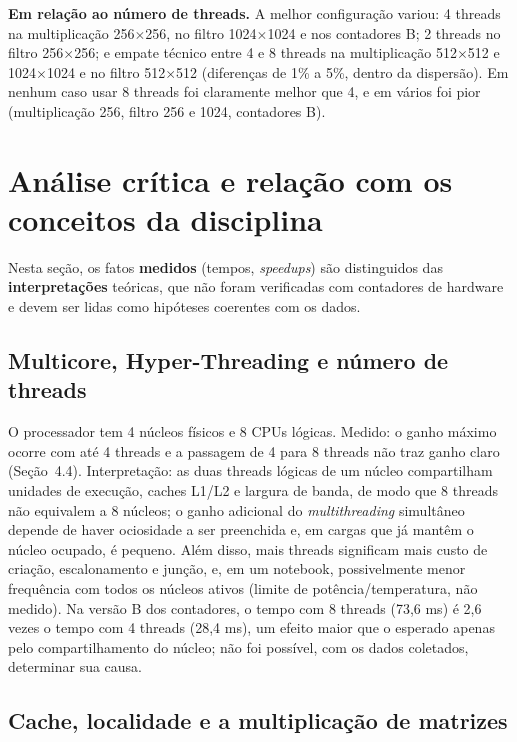 \documentclass[12pt,a4paper]{article}
\newcommand{\tx}{$\times$}
\begin{document}
\textbf{Em relação ao número de threads.} A melhor configuração variou: 4 threads na multiplicação 256\tx256, no filtro 1024\tx1024 e nos contadores B; 2 threads no filtro 256\tx256; e empate técnico entre 4 e 8 threads na multiplicação 512\tx512 e 1024\tx1024 e no filtro 512\tx512 (diferenças de 1\% a 5\%, dentro da dispersão). Em nenhum caso usar 8 threads foi claramente melhor que 4, e em vários foi pior (multiplicação 256, filtro 256 e 1024, contadores B).

\section{Análise crítica e relação com os conceitos da disciplina}

Nesta seção, os fatos \textbf{medidos} (tempos, \emph{speedups}) são distinguidos das \textbf{interpretações} teóricas, que não foram verificadas com contadores de hardware e devem ser lidas como hipóteses coerentes com os dados.

\subsection{Multicore, Hyper-Threading e número de threads}

O processador tem 4 núcleos físicos e 8 CPUs lógicas. Medido: o ganho máximo ocorre com até 4 threads e a passagem de 4 para 8 threads não traz ganho claro (Seção~4.4). Interpretação: as duas threads lógicas de um núcleo compartilham unidades de execução, caches L1/L2 e largura de banda, de modo que 8 threads não equivalem a 8 núcleos; o ganho adicional do \emph{multithreading} simultâneo depende de haver ociosidade a ser preenchida e, em cargas que já mantêm o núcleo ocupado, é pequeno. Além disso, mais threads significam mais custo de criação, escalonamento e junção, e, em um notebook, possivelmente menor frequência com todos os núcleos ativos (limite de potência/temperatura, não medido). Na versão B dos contadores, o tempo com 8 threads (73,6 ms) é 2,6 vezes o tempo com 4 threads (28,4 ms), um efeito maior que o esperado apenas pelo compartilhamento do núcleo; não foi possível, com os dados coletados, determinar sua causa.

\subsection{Cache, localidade e a multiplicação de matrizes}
\end{document}
